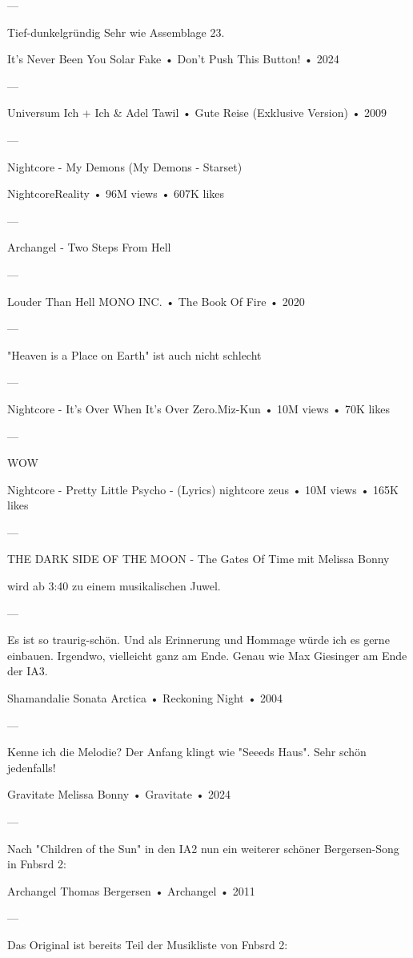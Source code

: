 —

Tief-dunkelgründig
Sehr wie Assemblage 23.

It's Never Been You
Solar Fake
 •
Don't Push This Button!
 •
2024

—

Universum
Ich + Ich
 &
Adel Tawil
 •
Gute Reise (Exklusive Version)
 •
2009

—

Nightcore - My Demons
(My Demons - Starset)

NightcoreReality
 •
96M views
 •
607K likes

—

Archangel - Two Steps From Hell

—

Louder Than Hell
MONO INC.
 •
The Book Of Fire
 •
2020

—

"Heaven is a Place on Earth" ist auch nicht schlecht

—

Nightcore - It's Over When It's Over
Zero.Miz-Kun
 •
10M views
 •
70K likes


—

WOW

Nightcore - Pretty Little Psycho - (Lyrics)
nightcore zeus
 •
10M views
 •
165K likes



—

THE DARK SIDE OF THE MOON - The Gates Of Time
mit Melissa Bonny

wird ab 3:40 zu einem musikalischen Juwel.

—

Es ist so traurig-schön.
Und als Erinnerung und Hommage würde ich es gerne einbauen. Irgendwo, vielleicht ganz am Ende. Genau wie Max Giesinger am Ende der IA3.

Shamandalie
Sonata Arctica
 •
Reckoning Night
 •
2004


—

Kenne ich die Melodie? Der Anfang klingt wie "Seeeds Haus". Sehr schön jedenfalls!

Gravitate
Melissa Bonny
 •
Gravitate
 •
2024

—

Nach "Children of the Sun" in den IA2 nun ein weiterer schöner Bergersen-Song in Fnbsrd 2:

Archangel
Thomas Bergersen
 •
Archangel
 •
2011

—

Das Original ist bereits Teil der Musikliste von Fnbsrd 2:

